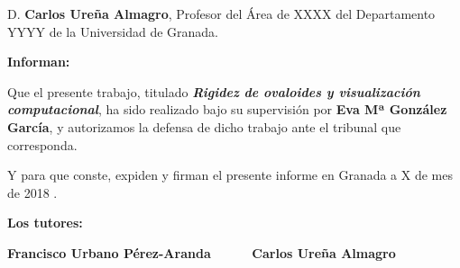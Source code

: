 \vspace{0.5cm}

D. \textbf{Carlos Ureña Almagro}, Profesor del Área de XXXX del Departamento YYYY de la Universidad de Granada.


\vspace{0.5cm}

\textbf{Informan:}

\vspace{0.5cm}

Que el presente trabajo, titulado \textit{\textbf{Rigidez de ovaloides y visualización computacional}},
ha sido realizado bajo su supervisión por \textbf{Eva Mª González García}, y autorizamos la defensa de dicho trabajo ante el tribunal que corresponda.

\vspace{0.5cm}

Y para que conste, expiden y firman el presente informe en Granada a X de mes de 2018 .

\vspace{1cm}

\textbf{Los tutores:}

\vspace{5cm}

\noindent \textbf{Francisco Urbano Pérez-Aranda \ \ \ \ \ Carlos Ureña Almagro}





